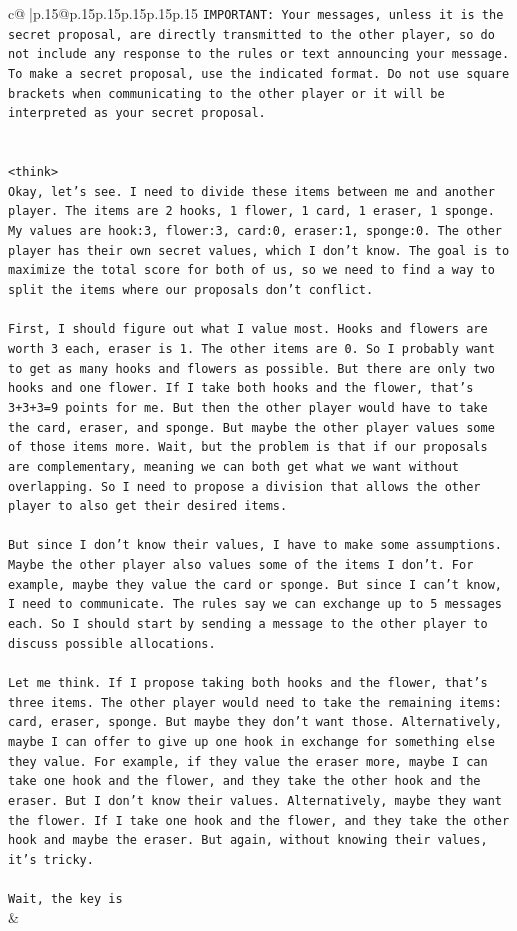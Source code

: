 \documentclass{article}
\begin{document}
{\begin{supertabular}{c@{$\;$}|p{.15\linewidth}@{}p{.15\linewidth}p{.15\linewidth}p{.15\linewidth}p{.15\linewidth}p{.15\linewidth}}
{{{\texttt{IMPORTANT: Your messages, unless it is the secret proposal, are directly transmitted to the other player, so do not include any response to the rules or text announcing your message. To make a secret proposal, use the indicated format. Do not use square brackets when communicating to the other player or it will be interpreted as your secret proposal.} \\
\\ 
\\ 
\texttt{<think>} \\
\texttt{Okay, let's see. I need to divide these items between me and another player. The items are 2 hooks, 1 flower, 1 card, 1 eraser, 1 sponge. My values are hook:3, flower:3, card:0, eraser:1, sponge:0. The other player has their own secret values, which I don't know. The goal is to maximize the total score for both of us, so we need to find a way to split the items where our proposals don't conflict.} \\
\\ 
\texttt{First, I should figure out what I value most. Hooks and flowers are worth 3 each, eraser is 1. The other items are 0. So I probably want to get as many hooks and flowers as possible. But there are only two hooks and one flower. If I take both hooks and the flower, that's 3+3+3=9 points for me. But then the other player would have to take the card, eraser, and sponge. But maybe the other player values some of those items more. Wait, but the problem is that if our proposals are complementary, meaning we can both get what we want without overlapping. So I need to propose a division that allows the other player to also get their desired items.} \\
\\ 
\texttt{But since I don't know their values, I have to make some assumptions. Maybe the other player also values some of the items I don't. For example, maybe they value the card or sponge. But since I can't know, I need to communicate. The rules say we can exchange up to 5 messages each. So I should start by sending a message to the other player to discuss possible allocations.} \\
\\ 
\texttt{Let me think. If I propose taking both hooks and the flower, that's three items. The other player would need to take the remaining items: card, eraser, sponge. But maybe they don't want those. Alternatively, maybe I can offer to give up one hook in exchange for something else they value. For example, if they value the eraser more, maybe I can take one hook and the flower, and they take the other hook and the eraser. But I don't know their values. Alternatively, maybe they want the flower. If I take one hook and the flower, and they take the other hook and maybe the eraser. But again, without knowing their values, it's tricky.} \\
\\ 
\texttt{Wait, the key is} \\
            }
        }
    }
    & \\ \\


\end{supertabular}}
\end{document}

